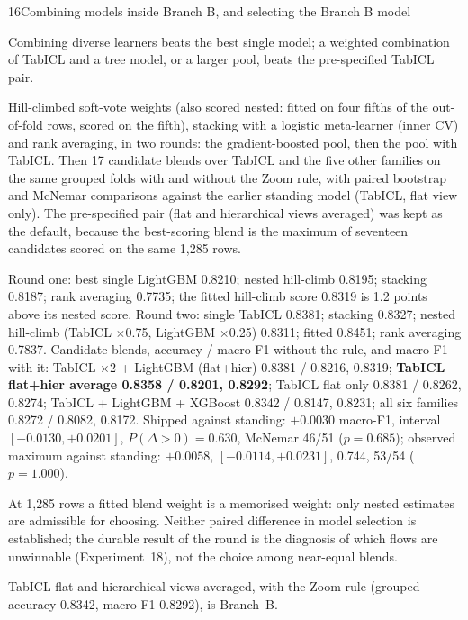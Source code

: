 \begin{explog}{16}{Combining models inside Branch B, and selecting the Branch B model}
\item[Hypothesis] Combining diverse learners beats the best single model; a weighted
combination of TabICL and a tree model, or a larger pool, beats the pre-specified
TabICL pair.
\item[Method] Hill-climbed soft-vote weights (also scored nested: fitted on four fifths of
the out-of-fold rows, scored on the fifth), stacking with a logistic meta-learner
(inner CV) and rank averaging, in two rounds: the gradient-boosted pool, then the
pool with TabICL. Then 17 candidate blends over TabICL and the five other families
on the same grouped folds with and without the Zoom rule, with paired bootstrap and
McNemar comparisons against the earlier standing model (TabICL, flat view only).
The pre-specified pair (flat and hierarchical views averaged) was kept as the
default, because the best-scoring blend is the maximum of seventeen candidates
scored on the same 1{,}285 rows.
\item[Result] Round one: best single LightGBM 0.8210; nested hill-climb 0.8195; stacking
0.8187; rank averaging 0.7735; the fitted hill-climb score 0.8319 is 1.2 points
above its nested score. Round two: single TabICL 0.8381; stacking 0.8327; nested
hill-climb (TabICL $\times$0.75, LightGBM $\times$0.25) 0.8311; fitted 0.8451; rank
averaging 0.7837. Candidate blends, accuracy / macro-F1 without the rule, and
macro-F1 with it: TabICL $\times$2 + LightGBM (flat+hier) 0.8381 / 0.8216, 0.8319;
\textbf{TabICL flat+hier average 0.8358 / 0.8201, 0.8292}; TabICL flat only 0.8381
/ 0.8262, 0.8274; TabICL + LightGBM + XGBoost 0.8342 / 0.8147, 0.8231; all six
families 0.8272 / 0.8082, 0.8172. Shipped against standing: $+0.0030$ macro-F1,
interval $[-0.0130,+0.0201]$, $P(\Delta>0)=0.630$, McNemar 46/51 ($p=0.685$);
observed maximum against standing: $+0.0058$, $[-0.0114,+0.0231]$, 0.744, 53/54
($p=1.000$).
\item[Inference] At 1{,}285 rows a fitted blend weight is a memorised weight: only nested
estimates are admissible for choosing. Neither paired difference in model
selection is established; the durable result of the round is the diagnosis of which
flows are unwinnable (Experiment~18), not the choice among near-equal blends.
\item[Verdict] TabICL flat and hierarchical views averaged, with the Zoom rule (grouped
accuracy 0.8342, macro-F1 0.8292), is Branch~B.
\end{explog}

